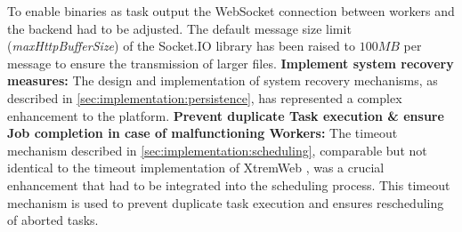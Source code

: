 To enable binaries as task output the WebSocket connection between workers and the backend had to be adjusted. The default message size limit (\emph{maxHttpBufferSize}) of the Socket.IO \cite{methodology:websockets2} library has been raised to $100MB$ per message to ensure the transmission of larger files.
\newline
\newline
\textbf{Implement system recovery measures:}
\newline
The design and implementation of system recovery mechanisms, as described in \autoref{sec:implementation:persistence}, has represented a complex enhancement to the platform.
\newline
\newline
\textbf{Prevent duplicate Task execution \& ensure Job completion in case of malfunctioning Workers:}
\newline
The timeout mechanism described in \autoref{sec:implementation:scheduling}, comparable but not identical to the timeout implementation of XtremWeb \cite{relatedwork:xtremweb}, was a crucial enhancement that had to be integrated into the scheduling process. This timeout mechanism is used to prevent duplicate task execution and ensures rescheduling of aborted tasks.